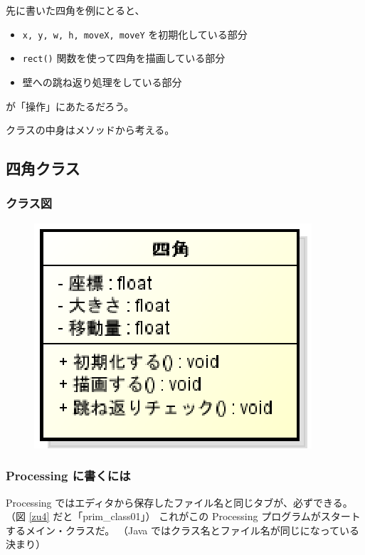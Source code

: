 \documentclass[uplatex,a4j,11pt]{jsarticle}
\begin{document}
先に書いた四角を例にとると、

\begin{itemize}
 \item \verb|x, y, w, h, moveX, moveY| を初期化している部分
 \item \verb|rect()| 関数を使って四角を描画している部分
 \item 壁への跳ね返り処理をしている部分
\end{itemize}

が「操作」にあたるだろう。

クラスの中身はメソッドから考える。

\subsection{四角クラス}


\subsubsection{クラス図}

\begin{figure}[hbp]
  \begin{center}
   \includegraphics[width=.2\paperwidth]{zu7.eps}
   \caption{}
   \label{zu3}
  \end{center}
\end{figure}

\subsubsection{Processing に書くには}

Processing ではエディタから保存したファイル名と同じタブが、必ずできる。
（図 \ref{zu4} だと「prim\_class01」）
これがこの Processing プログラムがスタートするメイン・クラスだ。
（Java ではクラス名とファイル名が同じになっている決まり）
\end{document}
